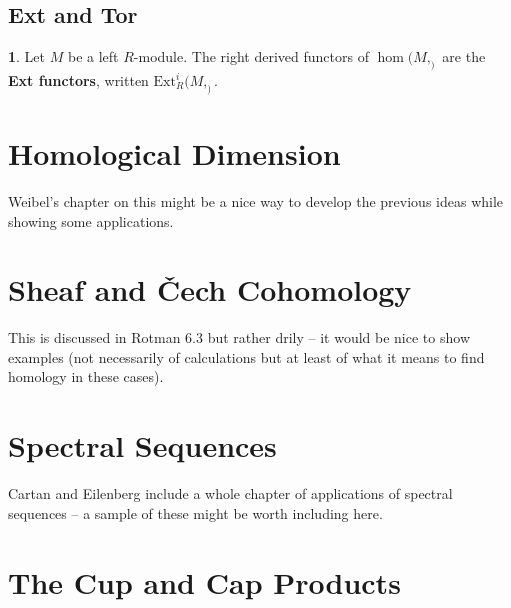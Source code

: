 \documentclass[oneside,english]{amsbook}
\numberwithin{section}{chapter}
\theoremstyle{plain}
\theoremstyle{definition}
\newtheorem{defn}[thm]{\protect\definitionname}
\providecommand{\definitionname}{Definition}
\providecommand{\Cech}{\v{C}ech }
\begin{document}
	
		\section{Ext and Tor}
		
			\begin{defn}
				Let $M$ be a left $R$-module. The right derived functors of $\hom(M, _)$ are the \textbf{Ext functors}, written $\text{Ext}^i_R(M, _)$.
			\end{defn}
	
	\chapter{Homological Dimension}
	
	Weibel's chapter on this might be a nice way to develop the previous ideas while showing some applications.
	
	\chapter{Sheaf and \Cech Cohomology}
	
	This is discussed in Rotman 6.3 but rather drily -- it would be nice to show examples (not necessarily of calculations but at least of what it means to find homology in these cases).

	\chapter{Spectral Sequences}
	
	Cartan and Eilenberg include a whole chapter of applications of spectral sequences -- a sample of these might be worth including here.

	\chapter{The Cup and Cap Products}
\end{document}
